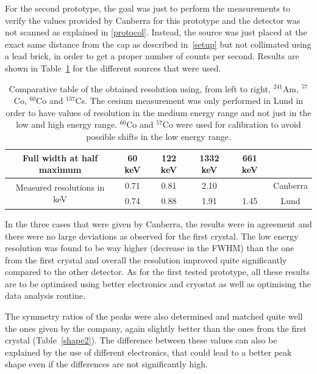 \documentclass[11pt,a4paper]{article}
\begin{document}
For the second prototype, the goal was just to perform the measurements to verify the values provided by Canberra for this prototype and the detector was not scanned as explained in \ref{protocol}. Instead, the source was just placed at the exact same distance from the cap as described in~\ref{setup} but not collimated using a lead brick, in order to get a proper number of counts per second. Results are shown in Table~\ref{recap2} for the different sources that were used.

\begin{table}[]
\centering
\caption{Comparative table of the obtained resolution using, from left to right, $^{241}$Am, $^{57}$Co, $^{60}$Co and $^{137}$Cs. The cesium measurement was only performed in Lund in order to have values of resolution in the medium energy range and not just in the low and high energy range. $^{60}$Co and $^{57}$Co were used for calibration to avoid possible shifts in the low energy range.}
\label{recap2}
\begin{tabular}{|c|c|c|c|c|c}
\cline{1-5}
Full width at half maximum                   & 60 keV & 122 keV & 1332 keV & 661 keV &                               \\ \hline
\multirow{2}{*}{Measured resolutions in keV} & 0.71   & 0.81    & 2.10     &         & \multicolumn{1}{c|}{Canberra} \\ \cline{2-6} 
                                             & 0.74   & 0.88    & 1.91     & 1.45    & \multicolumn{1}{c|}{Lund}     \\ \hline
\end{tabular}
\end{table}

In the three cases that were given by Canberra, the results were in agreement and there were no large deviations as observed for the first crystal. The low energy resolution was found to be way higher (decrease in the FWHM) than the one from the first crystal and overall the resolution improved quite significantly compared to the other detector. As for the first tested prototype, all these results are to be optimised using better electronics and cryostat as well as optimising the data analysis routine.

The symmetry ratios of the peaks were also determined and matched quite well the ones given by the company, again slightly better than the ones from the first crystal (Table~\ref{shape2}). The difference between these values can also be explained by the use of different electronics, that could lead to a better peak shape even if the differences are not significantly high.
\end{document}
